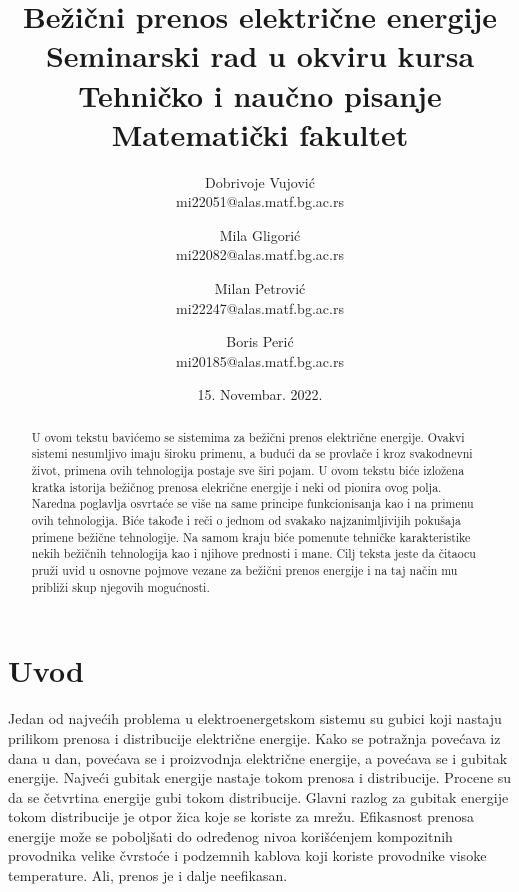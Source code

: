 \documentclass[a4paper]{article}
\begin{document}
	\title{Bežični prenos električne energije\\ \small{Seminarski rad u okviru kursa\\Tehničko i naučno pisanje\\ Matematički fakultet}}
	
	\author{Dobrivoje Vujović \\mi22051@alas.matf.bg.ac.rs 
			\and Mila Gligorić \\mi22082@alas.matf.bg.ac.rs
			\and Milan Petrović \\mi22247@alas.matf.bg.ac.rs
			\and Boris Perić\\mi20185@alas.matf.bg.ac.rs}

	\date{15. Novembar. 2022.}
	\maketitle
\begin{abstract}
    U ovom tekstu bavićemo se sistemima za bežični prenos električne energije. Ovakvi sistemi nesumljivo imaju široku primenu, a budući da se provlače i kroz svakodnevni život, primena ovih tehnologija postaje sve širi pojam. U ovom tekstu biće izložena kratka istorija bežičnog prenosa elekrične energije i neki od pionira ovog polja. Naredna poglavlja osvrtaće se više na same principe funkcionisanja kao i na primenu ovih tehnologija. Biće takođe i reči o jednom od svakako najzanimljivijih pokušaja primene bežične tehnologije. Na samom kraju biće pomenute tehničke karakteristike nekih bežičnih tehnologija kao i njihove prednosti i mane. Cilj teksta jeste da čitaocu pruži uvid u osnovne pojmove vezane za bežični prenos energije i na taj način mu približi skup njegovih mogućnosti.
\end{abstract}
\tableofcontents
\newpage

\section{Uvod}

Jedan od najvećih problema u elektroenergetskom sistemu su gubici koji nastaju prilikom prenosa i distribucije električne energije. Kako se potražnja povećava iz dana u dan, povećava se i proizvodnja električne energije, a povećava se i gubitak energije. Najveći gubitak energije nastaje tokom prenosa i distribucije. Procene su da se četvrtina energije gubi tokom distribucije. Glavni razlog za gubitak energije tokom distribucije je otpor žica koje se koriste za mrežu. Efikasnost prenosa energije može se poboljšati do određenog nivoa korišćenjem kompozitnih provodnika velike čvrstoće i podzemnih kablova koji koriste provodnike visoke temperature. Ali, prenos je i dalje neefikasan.
\end{document}
